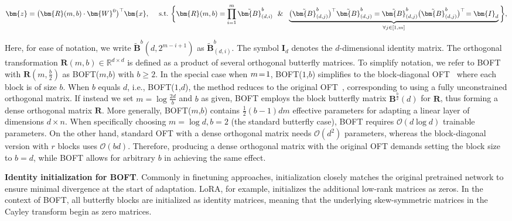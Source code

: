 \begin{equation}
    \begin{aligned}\nonumber
    \bm{z}=\big(\bm{R}(m,b)\cdot\bm{W}^0\big)^\top\bm{x},~~~~\text{s.t.}~\bigg{\{}\bm{R}(m,b)=\prod_{i=1}^m \tilde{\bm{B}}^b_{(d,i)}~~\&~~\underbrace{\big(\tilde{\bm{B}}^b_{(d,j)}\big)^\top\tilde{\bm{B}}^b_{(d,j)}=\tilde{\bm{B}}^b_{(d,j)}\big(\tilde{\bm{B}}^b_{(d,j)}\big)^\top\!=\bm{I}_d}_{\forall j\in [1, m]}\bigg{\}},
    \end{aligned}
\end{equation}

Here, for ease of notation, we write $\tilde{\bm{B}}^b(d,2^{m - i+1})$ as $\tilde{\bm{B}}^b_{(d,i)}$. The symbol $\bm{I}_d$ denotes the $d$-dimensional identity matrix. The orthogonal transformation $\bm{R}(m,b)\in\mathbb{R}^{d\times d}$ is defined as a product of several orthogonal butterfly matrices. To simplify notation, we refer to BOFT with $\bm{R}(m,\frac{b}{2})$ as BOFT($m$,$b$) with $b\geq 2$. In the special case when $\thickmuskip=2mu \medmuskip=2mu m=1$, BOFT($1$,$b$) simplifies to the block-diagonal OFT~\cite{qiu2023controlling} where each block is of size $b$. When $b$ equals $d$, i.e., BOFT($1$,$d$), the method reduces to the original OFT~\cite{qiu2023controlling}, corresponding to using a fully unconstrained orthogonal matrix. If instead we set $m = \log \frac{2d}{b}$ and $b$ as given, BOFT employs the block butterfly matrix $\bm{B}^{\frac{b}{2}}(d)$ for $\bm{R}$, thus forming a dense orthogonal matrix $\bm{R}$. More generally, BOFT($m$,$b$) contains $\frac{1}{2}(b-1)dm$ effective parameters for adapting a linear layer of dimensions $d\times n$. When specifically choosing $m=\log d, b=2$ (the standard butterfly case), BOFT requires $\mathcal{O}(d\log d)$ trainable parameters. On the other hand, standard OFT with a dense orthogonal matrix needs $\mathcal{O}(d^2)$ parameters, whereas the block-diagonal version with $r$ blocks uses $\mathcal{O}(bd)$. Therefore, producing a dense orthogonal matrix with the original OFT demands setting the block size to $b=d$, while BOFT allows for arbitrary $b$ in achieving the same effect.

\textbf{Identity initialization for BOFT}. Commonly in finetuning approaches, initialization closely matches the original pretrained network to ensure minimal divergence at the start of adaptation. LoRA, for example, initializes the additional low-rank matrices as zeros. In the context of BOFT, all butterfly blocks are initialized as identity matrices, meaning that the underlying skew-symmetric matrices in the Cayley transform begin as zero matrices.

